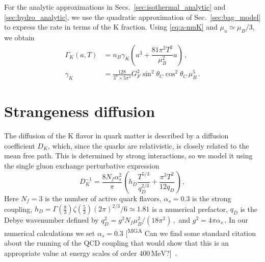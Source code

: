 \documentclass[10pt,superscriptaddress,
amsmath,aps,prc,twocolumn,nofootinbib,floatfix]{revtex4-1}
\newcommand{\mgacom}[1]{\textsf{\color[rgb]{0.8,0,0}[\textsuperscript{MGA} #1]}}
\newcommand{\JS}[1]{{\color{violet}#1}}
\newcommand{\al}{\alpha}
\newcommand{\dsp}{\displaystyle}
\newcommand{\hide}[1]{}
\newcommand{\MeV}{\text{MeV}}
\begin{document}
\hide{
For massless quarks, at leading order in $3\mu_K/\mu_B$ and $3T/\mu_B\,,$ the charge-neutral quark equation of state gives
\begin{equation}
 \mu_u\simeq\frac{\mu_B}{3}\,,
 \qquad
 n_B\simeq\frac{\mu_B^3}{27\pi^2}\,,
 \qquad
 \mu_K\simeq\frac{2\mu_B a}{9}\,.
\label{eq:cubic_rate_expansion}
\end{equation}
Substituting Eq.~\eqref{eq:cubic_rate_expansion} into the exact rate in Eqs.~\eqref{eq:exact_rate} and \eqref{eq:exact_prefactor}, and retaining the leading cubic and thermal-linear terms, gives
\begin{subequations}
\label{eq:cubic_rate}
\begin{align}
 \Gamma_K(n_K,T)
 &=n_B\gamma_K\left(a^3+\frac{81\pi^2T^2}{\mu_B^2}a\right)\,,
\label{eq:source}\\
 \gamma_K
 &=\frac{128}{3^8\times5\pi^3}
 G_F^2\sin^2\theta_C\cos^2\theta_C\,\mu_B^5\,.
\label{eq:gammaK}
\end{align}
\end{subequations}
}

For the analytic approximations in \JS{Secs.~\ref{sec:isothermal_analytic} and \ref{sec:hydro_analytic}}, we use the quadratic approximation of Sec.~\ref{sec:bag_model} to express the rate in terms of the K fraction.
Using \eqref{eq:a-muK} and $\mu_u\simeq\mu_B/3$, we obtain
\begin{equation}
\begin{array}{rl}
 \Gamma_K(a,T) &=n_B\gamma_K\left(a^3+\dfrac{81\pi^2T^2}{\mu_B^2}a\right)\,, \\[2ex]
 \gamma_K &= \dsp\frac{128}{3^8\times5\pi^3}
 G_F^2\sin^2\theta_C\cos^2\theta_C\,\mu_B^5\,.
\end{array} \label{eq:cubic_rate}
\end{equation}


\section{Strangeness diffusion}
\label{sec:K-diffusion}

The diffusion of the K flavor in quark matter is described by a diffusion coefficient $D_K$, which, since the quarks are relativistic, is closely related to the mean free path.
This is determined by strong interactions, so we model it using
the single gluon exchange perturbative expression \cite{Haensel:1992zz,Heiselberg:1993cr}
\begin{equation}
 D_K^{-1}
 =
 \frac{8N_f\alpha_s^2}{\pi}
 \left(
 h_D\frac{T^{5/3}}{q_D^{2/3}}
 +\frac{\pi^3T^2}{12q_D}
 \right)\,,
\label{eq:diffusion_coefficient}
\end{equation}
Here $N_f=3$ is the number of active quark flavors, $\alpha_s=0.3$ is the strong coupling, $h_D = \Gamma(\frac{8}{3})\zeta(\frac{5}{3})(2\pi)^{2/3}/6 \simeq1.81$ is a numerical prefactor, $q_D$ is the Debye wavenumber defined by $q_D^2=g^2N_f\mu_B^2/(18\pi^2)\,,$ and $g^2=4\pi\alpha_s\,.$
In our numerical calculations we set $\al_s=0.3$
\mgacom{Can we find some standard citation about the running of the QCD coupling that would show that this is an appropriate value at energy scales of order $400\,\MeV$?}\JS{\cite{Farhi:1984qu,Madsen:1998uh}}\ .
\end{document}
